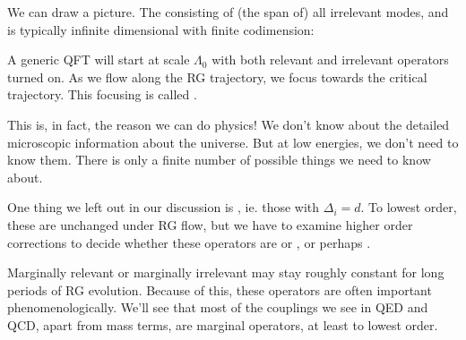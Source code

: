 \documentclass[a4paper]{article}
\begin{document}
We can draw a picture. The  consisting of (the span of) all irrelevant modes, and is typically infinite dimensional with finite codimension:
\begin{center}
\end{center}
A generic QFT will start at scale $\Lambda_0$ with both relevant and irrelevant operators turned on. As we flow along the RG trajectory, we focus towards the critical trajectory. This focusing is called .

This is, in fact, the reason we can do physics! We don't know about the detailed microscopic information about the universe. But at low energies, we don't need to know them. There is only a finite number of possible things we need to know about.

One thing we left out in our discussion is , ie. those with $\Delta_i = d$. To lowest order, these are unchanged under RG flow, but we have to examine higher order corrections to decide whether these operators are  or , or perhaps .

Marginally relevant or marginally irrelevant may stay roughly constant for long periods of RG evolution. Because of this, these operators are often important phenomenologically. We'll see that most of the couplings we see in QED and QCD, apart from mass terms, are marginal operators, at least to lowest order.
\end{document}
